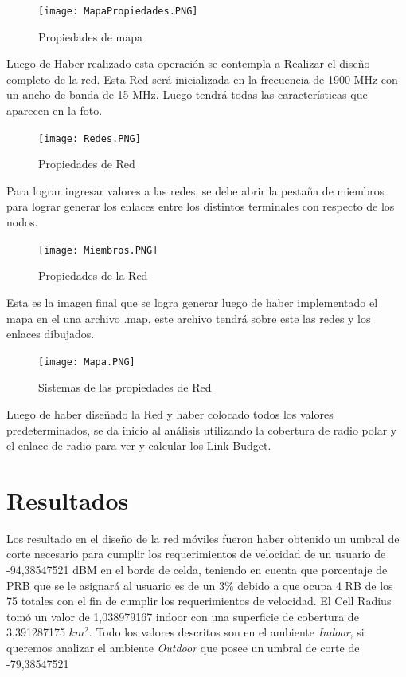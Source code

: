 \documentclass[Article, letterpaper,12pt]{article}
\begin{document}
\begin{figure}[H]
    \centering
    \texttt{[image: MapaPropiedades.PNG]}
    \caption{Propiedades de mapa}
    \label{fig:my_label}
\end{figure}

Luego de Haber realizado esta operación se contempla a Realizar el diseño completo de la red. Esta Red será inicializada en la frecuencia de 1900 MHz con un ancho de banda de 15 MHz. Luego tendrá todas las características que aparecen en la foto.

\begin{figure}[H]
    \centering
    \texttt{[image: Redes.PNG]}
    \caption{Propiedades de Red}
    \label{fig:my_label}
\end{figure}

Para lograr ingresar valores a las redes, se debe abrir la pestaña de miembros para lograr generar los enlaces entre los distintos terminales con respecto de los nodos.
\begin{figure}[H]
    \centering
    \texttt{[image: Miembros.PNG]}
    \caption{Propiedades de la Red}
    \label{fig:my_label}
\end{figure}

Esta es la imagen final que se logra generar luego de haber implementado el mapa en el una archivo .map, este archivo tendrá sobre este las redes y los enlaces dibujados.

\begin{figure}[H]
    \centering
    \texttt{[image: Mapa.PNG]}
    \caption{Sistemas de las propiedades de Red}
    \label{fig:my_label}
\end{figure}

Luego de haber diseñado la Red y haber colocado todos los valores predeterminados, se da inicio al análisis utilizando la cobertura de radio polar y el enlace de radio para ver y calcular los Link Budget.

\section{Resultados}
 Los resultado en el diseño de la red móviles fueron haber obtenido un umbral de corte necesario para cumplir los requerimientos de velocidad de un usuario de  -94,38547521 dBM en el borde de celda, teniendo en cuenta que porcentaje de PRB que se le asignará al usuario es de un 3\% debido a que ocupa 4 RB de los 75 totales  con el fin de cumplir los requerimientos de velocidad.
 El Cell Radius tomó un valor de 1,038979167 indoor con una superficie de cobertura de 3,391287175 $km^{2}$. Todo los valores descritos son en el ambiente \textit{Indoor}, si queremos analizar el ambiente \textit{Outdoor} que posee un umbral de corte de -79,38547521
\end{document}
